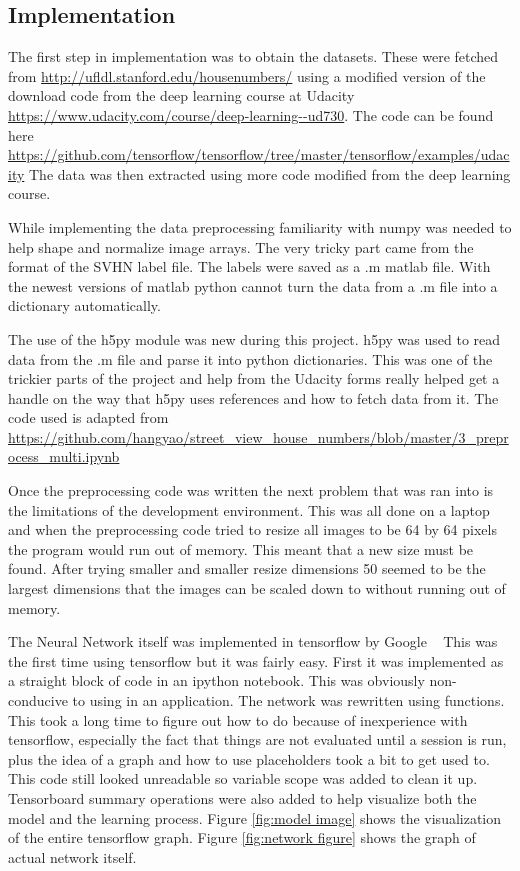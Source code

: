 \documentclass[12pt,twocolumn,letterpaper]{article}
\begin{document}
\subsection{Implementation}
The first step in implementation was to obtain the datasets. These were fetched 
from \url{http://ufldl.stanford.edu/housenumbers/} using a modified version of 
the download code from the deep learning course at Udacity 
\url{https://www.udacity.com/course/deep-learning--ud730}. The code can be found here
\url{https://github.com/tensorflow/tensorflow/tree/master/tensorflow/examples/udacity} The data was then 
extracted using more code modified from the deep learning course. 

While implementing the data preprocessing familiarity with numpy was needed to help 
shape and normalize image arrays. The very tricky part came from the format of 
the SVHN label file. The labels were saved as a .m matlab file. With the newest 
versions of matlab python cannot turn the data from a .m file into a dictionary 
automatically. 

The use of the h5py module was new during this project. h5py was used to read 
data from the .m file and parse it into python dictionaries. This was one of the 
trickier parts of the project and help from the Udacity forms really helped get 
a handle on the way that h5py uses references and how to fetch data from it. The 
code used is adapted from \url{https://github.com/hangyao/street_view_house_numbers/blob/master/3_preprocess_multi.ipynb}

Once the preprocessing code was written the next problem that was ran into is the
limitations of the development environment. This was all done on a laptop and when the 
preprocessing code tried to resize all images to be 64 by 64 pixels the program 
would run out of memory. This meant that a new size must be found. After trying 
smaller and smaller resize dimensions 50 seemed to be the largest dimensions that 
the images can be scaled down to without running out of memory.

The Neural Network itself was implemented in tensorflow by Google ~\cite{Google} 
This was the first time using tensorflow but it was fairly easy. First it was 
implemented as a straight block of code in an ipython notebook. This was 
obviously non-conducive to using in an application. The network was rewritten 
using functions. This took a long time to figure out how to do because of 
inexperience with tensorflow, especially the fact that things are not evaluated 
until a session is run, plus the idea of a graph and how to use placeholders 
took a bit to get used to. This code still looked unreadable so variable scope 
was added to clean it up. Tensorboard summary operations were also added to help 
visualize both the model and the learning process. Figure \ref{fig:model image} shows the visualization 
of the entire tensorflow graph. Figure \ref{fig:network figure} shows the graph of actual network itself.
\end{document}
